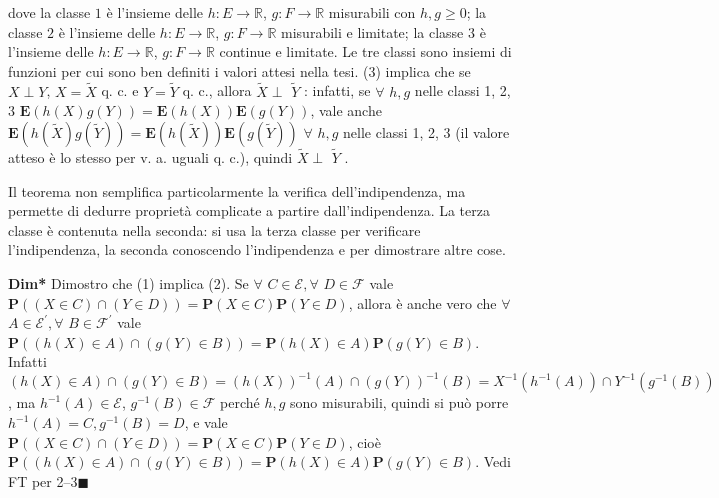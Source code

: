 \documentclass{article}
\begin{document}
dove la classe $1$ \`{e} l'insieme delle $h:E\rightarrow 
\mathbb{R}
$, $g:F\rightarrow 
\mathbb{R}
$ misurabili con $h,g\geq 0$; la classe $2$ \`{e} l'insieme delle $%
h:E\rightarrow 
\mathbb{R}
$, $g:F\rightarrow 
\mathbb{R}
$ misurabili e limitate; la classe $3$ \`{e} l'insieme delle $h:E\rightarrow 
\mathbb{R}
$, $g:F\rightarrow 
\mathbb{R}
$ continue e limitate. Le tre classi sono insiemi di funzioni per cui sono
ben definiti i valori attesi nella tesi. (3) implica che se $X\perp Y$, $X=%
\tilde{X}$ q. c. e $Y=\tilde{Y}$ q. c., allora $\tilde{X}\perp $ $\tilde{Y}$%
: infatti, se $\forall $ $h,g$ nelle classi 1, 2, 3 $\mathbf{E}\left(
h\left( X\right) g\left( Y\right) \right) =\mathbf{E}\left( h\left( X\right)
\right) \mathbf{E}\left( g\left( Y\right) \right) $, vale anche $\mathbf{E}%
\left( h\left( \tilde{X}\right) g\left( \tilde{Y}\right) \right) =\mathbf{E}%
\left( h\left( \tilde{X}\right) \right) \mathbf{E}\left( g\left( \tilde{Y}%
\right) \right) $ $\forall $ $h,g$ nelle classi 1, 2, 3 (il valore atteso 
\`{e} lo stesso per v. a. uguali q. c.), quindi $\tilde{X}\perp $ $\tilde{Y}$%
.

Il teorema non semplifica particolarmente la verifica dell'indipendenza, ma
permette di dedurre propriet\`{a} complicate a partire dall'indipendenza. La
terza classe \`{e} contenuta nella seconda: si usa la terza classe per
verificare l'indipendenza, la seconda conoscendo l'indipendenza e per
dimostrare altre cose.

\textbf{Dim*} Dimostro che (1) implica (2). Se $\forall $ $C\in \mathcal{E}%
,\forall $ $D\in \mathcal{F}$ vale $\mathbf{P}\left( \left( X\in C\right)
\cap \left( Y\in D\right) \right) =\mathbf{P}\left( X\in C\right) \mathbf{P}%
\left( Y\in D\right) $, allora \`{e} anche vero che $\forall $ $A\in 
\mathcal{E}^{\prime },\forall $ $B\in \mathcal{F}^{\prime }$ vale $\mathbf{P}%
\left( \left( h\left( X\right) \in A\right) \cap \left( g\left( Y\right) \in
B\right) \right) =\mathbf{P}\left( h\left( X\right) \in A\right) \mathbf{P}%
\left( g\left( Y\right) \in B\right) $. Infatti $\left( h\left( X\right) \in
A\right) \cap \left( g\left( Y\right) \in B\right) =\left( h\left( X\right)
\right) ^{-1}\left( A\right) \cap \left( g\left( Y\right) \right)
^{-1}\left( B\right) =X^{-1}\left( h^{-1}\left( A\right) \right) \cap
Y^{-1}\left( g^{-1}\left( B\right) \right) $, ma $h^{-1}\left( A\right) \in 
\mathcal{E}$, $g^{-1}\left( B\right) \in \mathcal{F}$ perch\'{e} $h,g$ sono
misurabili, quindi si pu\`{o} porre $h^{-1}\left( A\right) =C,g^{-1}\left(
B\right) =D$, e vale $\mathbf{P}\left( \left( X\in C\right) \cap \left( Y\in
D\right) \right) =\mathbf{P}\left( X\in C\right) \mathbf{P}\left( Y\in
D\right) $, cio\`{e} $\mathbf{P}\left( \left( h\left( X\right) \in A\right)
\cap \left( g\left( Y\right) \in B\right) \right) =\mathbf{P}\left( h\left(
X\right) \in A\right) \mathbf{P}\left( g\left( Y\right) \in B\right) $. Vedi
FT per 2--\TEXTsymbol{>}3$\blacksquare $
\end{document}
